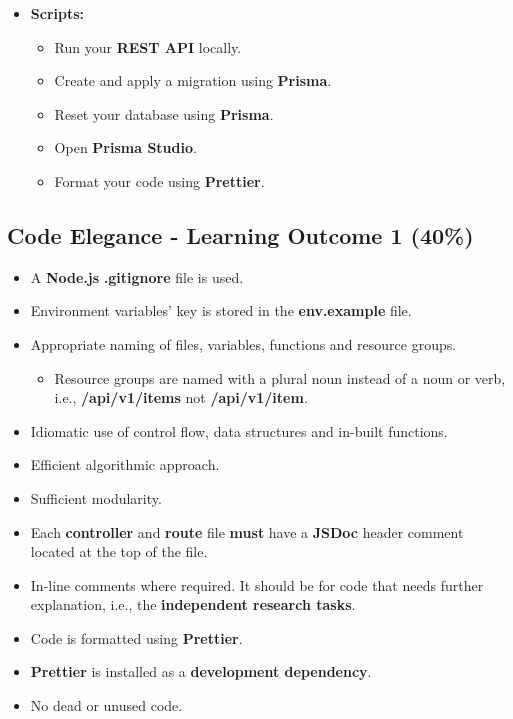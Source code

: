 \documentclass{article}
\begin{document}
\begin{itemize}
	\item \textbf{Scripts:}
	\begin{itemize}
		\item Run your \textbf{REST API} locally.
		\item Create and apply a migration using \textbf{Prisma}.
		\item Reset your database using \textbf{Prisma}.
		\item Open \textbf{Prisma Studio}. 
		\item Format your code using \textbf{Prettier}.
	\end{itemize}
\end{itemize}

\subsection*{Code Elegance - Learning Outcome 1 (40\%)}
\begin{itemize}
	\item A \textbf{Node.js} \textbf{.gitignore} file is used.
	\item Environment variables' key is stored in the \textbf{env.example} file. 
  \item Appropriate naming of files, variables, functions and resource groups.
  \begin{itemize}
	\item Resource groups are named with a plural noun instead of a noun or verb, i.e., \textbf{/api/v1/items} not \textbf{/api/v1/item}.
  \end{itemize}
	\item Idiomatic use of control flow, data structures and in-built functions.
  \item Efficient algorithmic approach.
  \item Sufficient modularity.
  \item Each \textbf{controller} and \textbf{route} file \textbf{must} have a \textbf{JSDoc} header comment located at the top of the file.
\item In-line comments where required. It should be for code that needs further explanation, i.e., the \textbf{independent research tasks}.
  \item Code is formatted using \textbf{Prettier}.
  \item \textbf{Prettier} is installed as a \textbf{development dependency}.	
\item No dead or unused code. 
\end{itemize}
\end{document}
